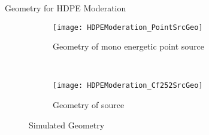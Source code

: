 \documentclass[compress]{beamer}
\begin{document}
\begin{frame}{Geometry for HDPE Moderation}
\begin{figure}
  \begin{subfigure}[b]{0.45\textwidth}
    \centering
    \texttt{[image: HDPEModeration\_PointSrcGeo]}
    \caption{Geometry of mono energetic point source}
  \end{subfigure}%
  ~
  \begin{subfigure}[b]{0.45\textwidth}
    \centering
    \texttt{[image: HDPEModeration\_Cf252SrcGeo]}
    \caption{Geometry of  source}
  \end{subfigure}
  \caption{Simulated Geometry}
\end{figure}
\end{frame}
\end{document}

